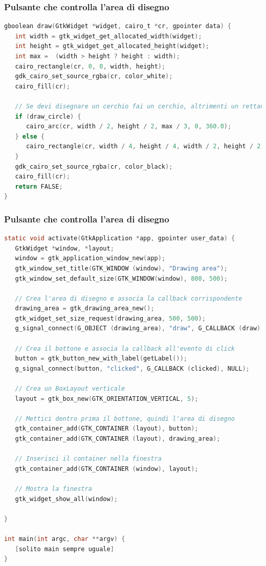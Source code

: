 \documentclass{beamer}
\begin{document}
\begin{frame}[fragile]
\frametitle{Pulsante che controlla l'area di disegno}
\begin{lstlisting}[language=C]
gboolean draw(GtkWidget *widget, cairo_t *cr, gpointer data) {
   int width = gtk_widget_get_allocated_width(widget);
   int height = gtk_widget_get_allocated_height(widget);
   int max =  (width > height ? height : width);
   cairo_rectangle(cr, 0, 0, width, height);
   gdk_cairo_set_source_rgba(cr, color_white);
   cairo_fill(cr);
   
   // Se devi disegnare un cerchio fai un cerchio, altrimenti un rettangolo
   if (draw_circle) {
      cairo_arc(cr, width / 2, height / 2, max / 3, 0, 360.0);
   } else {
      cairo_rectangle(cr, width / 4, height / 4, width / 2, height / 2);
   }
   gdk_cairo_set_source_rgba(cr, color_black);
   cairo_fill(cr);
   return FALSE;
}
\end{lstlisting}
\end{frame}


\begin{frame}[fragile]
\frametitle{Pulsante che controlla l'area di disegno}
\begin{lstlisting}[language=C]
static void activate(GtkApplication *app, gpointer user_data) {
   GtkWidget *window, *layout;
   window = gtk_application_window_new(app);
   gtk_window_set_title(GTK_WINDOW (window), "Drawing area");
   gtk_window_set_default_size(GTK_WINDOW(window), 800, 500);

   // Crea l'area di disegno e associa la callback corrispondente
   drawing_area = gtk_drawing_area_new();
   gtk_widget_set_size_request(drawing_area, 500, 500);
   g_signal_connect(G_OBJECT (drawing_area), "draw", G_CALLBACK (draw), NULL);

   // Crea il bottone e associa la callback all'evento di click
   button = gtk_button_new_with_label(getLabel());
   g_signal_connect(button, "clicked", G_CALLBACK (clicked), NULL);

   // Crea un BoxLayout verticale
   layout = gtk_box_new(GTK_ORIENTATION_VERTICAL, 5);
   
   // Mettici dentro prima il bottone, quindi l'area di disegno
   gtk_container_add(GTK_CONTAINER (layout), button);
   gtk_container_add(GTK_CONTAINER (layout), drawing_area);
   
   // Inserisci il container nella finestra
   gtk_container_add(GTK_CONTAINER (window), layout);

   // Mostra la finestra
   gtk_widget_show_all(window);

}

int main(int argc, char **argv) {
   [solito main sempre uguale]
}
\end{lstlisting}
\end{frame}
\end{document}
